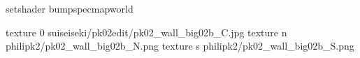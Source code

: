 setshader bumpspecmapworld

texture 0 suiseiseki/pk02edit/pk02_wall_big02b_C.jpg
texture n philipk2/pk02_wall_big02b_N.png
texture s philipk2/pk02_wall_big02b_S.png

